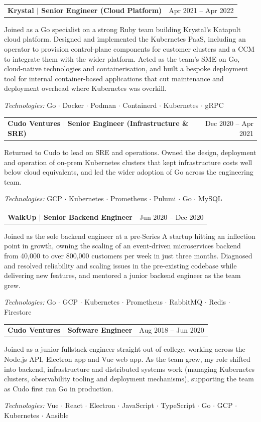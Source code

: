 \documentclass[letterpaper,11pt]{article}
\makeatletter
\newcommand{\resumeSubheading}[2]{
  \vspace{-2pt}\item
    \begin{tabular*}{0.97\textwidth}[t]{l@{\extracolsep{\fill}}r}
      \textbf{#1} & #2 \\
    \end{tabular*}\vspace{-7pt}
}
\newcommand{\resumeProse}[1]{\item\small{#1}\vspace{-4pt}}
\makeatother
\begin{document}
    \filbreak
    \resumeSubheading
      {Krystal $|$ Senior Engineer (Cloud Platform)}{Apr 2021 -- Apr 2022}
      \resumeProse{Joined as a Go specialist on a strong Ruby team building Krystal's Katapult cloud platform. Designed and implemented the Kubernetes PaaS, including an operator to provision control-plane components for customer clusters and a CCM to integrate them with the wider platform. Acted as the team's SME on Go, cloud-native technologies and containerisation, and built a bespoke deployment tool for internal container-based applications that cut maintenance and deployment overhead where Kubernetes was overkill.}
      \resumeProse{\textit{Technologies: }Go $\cdot$ Docker $\cdot$ Podman $\cdot$ Containerd $\cdot$ Kubernetes $\cdot$ gRPC}

    \filbreak
    \resumeSubheading
      {Cudo Ventures $|$ Senior Engineer (Infrastructure \& SRE)}{Dec 2020 -- Apr 2021}
      \resumeProse{Returned to Cudo to lead on SRE and operations. Owned the design, deployment and operation of on-prem Kubernetes clusters that kept infrastructure costs well below cloud equivalents, and led the wider adoption of Go across the engineering team.}
      \resumeProse{\textit{Technologies: }GCP $\cdot$ Kubernetes $\cdot$ Prometheus $\cdot$ Pulumi $\cdot$ Go $\cdot$ MySQL}

    \filbreak
    \resumeSubheading
      {WalkUp $|$ Senior Backend Engineer}{Jun 2020 -- Dec 2020}
      \resumeProse{Joined as the sole backend engineer at a pre-Series A startup hitting an inflection point in growth, owning the scaling of an event-driven microservices backend from 40,000 to over 800,000 customers per week in just three months. Diagnosed and resolved reliability and scaling issues in the pre-existing codebase while delivering new features, and mentored a junior backend engineer as the team grew.}
      \resumeProse{\textit{Technologies: }Go $\cdot$ GCP $\cdot$ Kubernetes $\cdot$ Prometheus $\cdot$ RabbitMQ $\cdot$ Redis $\cdot$ Firestore}

    \filbreak
    \resumeSubheading
      {Cudo Ventures $|$ Software Engineer}{Aug 2018 -- Jun 2020}
      \resumeProse{Joined as a junior fullstack engineer straight out of college, working across the Node.js API, Electron app and Vue web app. As the team grew, my role shifted into backend, infrastructure and distributed systems work (managing Kubernetes clusters, observability tooling and deployment mechanisms), supporting the team as Cudo first ran Go in production.}
      \resumeProse{\textit{Technologies: }Vue $\cdot$ React $\cdot$ Electron $\cdot$ JavaScript $\cdot$ TypeScript $\cdot$ Go $\cdot$ GCP $\cdot$ Kubernetes $\cdot$ Ansible}
\end{document}

